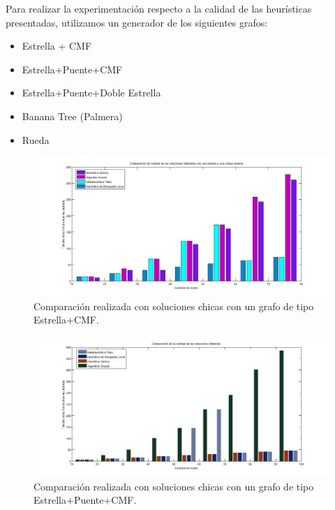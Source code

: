 
Para realizar la experimentación respecto a la calidad de las heurísticas presentadas, utilizamos un generador de los siguientes grafos:
\begin{itemize}
\item Estrella + CMF
\item Estrella+Puente+CMF
\item Estrella+Puente+Doble Estrella
\item Banana Tree (Palmera)
\item Rueda
\end{itemize}

 \begin{figure}[H] %
\begin{center}
\includegraphics[width=400pt]{../imgs/calidadSolucionesChicas15.jpg}
\caption{Comparación realizada con soluciones chicas con un grafo de tipo Estrella+CMF.}
\end{center}
\end{figure}

 \begin{figure}[H] %
\begin{center}
\includegraphics[width=400pt]{../imgs/calidadSolucionesChica14.jpg}
\caption{Comparación realizada con soluciones chicas con un grafo de tipo Estrella+Puente+CMF.}
\end{center}
\end{figure}

